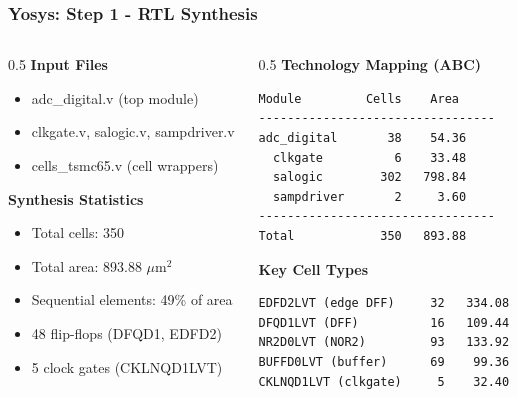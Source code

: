 \documentclass[aspectratio=169]{beamer}
\begin{document}
\begin{frame}[fragile]
  \frametitle{Yosys: Step 1 - RTL Synthesis}
  \begin{columns}
    \begin{column}{0.5\textwidth}
      \textbf{Input Files}
      \begin{itemize}
        \item adc\_digital.v (top module)
        \item clkgate.v, salogic.v, sampdriver.v
        \item cells\_tsmc65.v (cell wrappers)
      \end{itemize}
      \vspace{1em}
      \textbf{Synthesis Statistics}
      \begin{itemize}
        \item Total cells: 350
        \item Total area: 893.88 $\mu$m$^2$
        \item Sequential elements: 49\% of area
        \item 48 flip-flops (DFQD1, EDFD2)
        \item 5 clock gates (CKLNQD1LVT)
      \end{itemize}
    \end{column}
    \begin{column}{0.5\textwidth}
      \textbf{Technology Mapping (ABC)}
      \begin{lstlisting}[basicstyle=\ttfamily\scriptsize]
Module         Cells    Area
---------------------------------
adc_digital       38    54.36
  clkgate          6    33.48
  salogic        302   798.84
  sampdriver       2     3.60
---------------------------------
Total            350   893.88
      \end{lstlisting}
      \vspace{0.5em}
      \textbf{Key Cell Types}
      \begin{lstlisting}[basicstyle=\ttfamily\scriptsize]
EDFD2LVT (edge DFF)     32   334.08
DFQD1LVT (DFF)          16   109.44
NR2D0LVT (NOR2)         93   133.92
BUFFD0LVT (buffer)      69    99.36
CKLNQD1LVT (clkgate)     5    32.40
      \end{lstlisting}
    \end{column}
  \end{columns}
\end{frame}
\end{document}
